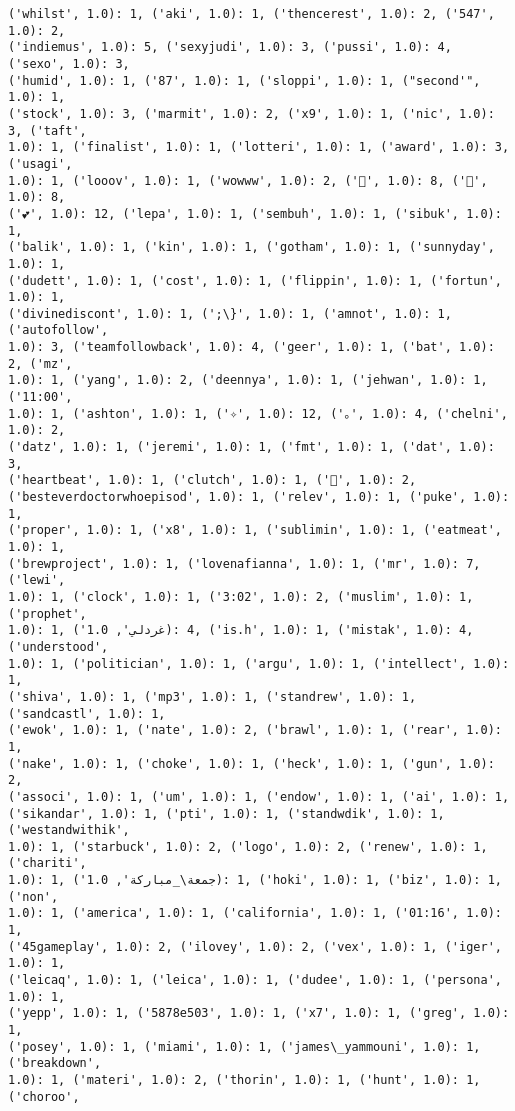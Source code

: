 \documentclass[11pt]{article}
\begin{document}
\begin{Verbatim}[commandchars=\\\{\}]
('whilst', 1.0): 1, ('aki', 1.0): 1, ('thencerest', 1.0): 2, ('547', 1.0): 2,
('indiemus', 1.0): 5, ('sexyjudi', 1.0): 3, ('pussi', 1.0): 4, ('sexo', 1.0): 3,
('humid', 1.0): 1, ('87', 1.0): 1, ('sloppi', 1.0): 1, ("second'", 1.0): 1,
('stock', 1.0): 3, ('marmit', 1.0): 2, ('x9', 1.0): 1, ('nic', 1.0): 3, ('taft',
1.0): 1, ('finalist', 1.0): 1, ('lotteri', 1.0): 1, ('award', 1.0): 3, ('usagi',
1.0): 1, ('looov', 1.0): 1, ('wowww', 1.0): 2, ('💙', 1.0): 8, ('💚', 1.0): 8,
('💕', 1.0): 12, ('lepa', 1.0): 1, ('sembuh', 1.0): 1, ('sibuk', 1.0): 1,
('balik', 1.0): 1, ('kin', 1.0): 1, ('gotham', 1.0): 1, ('sunnyday', 1.0): 1,
('dudett', 1.0): 1, ('cost', 1.0): 1, ('flippin', 1.0): 1, ('fortun', 1.0): 1,
('divinediscont', 1.0): 1, (';\}', 1.0): 1, ('amnot', 1.0): 1, ('autofollow',
1.0): 3, ('teamfollowback', 1.0): 4, ('geer', 1.0): 1, ('bat', 1.0): 2, ('mz',
1.0): 1, ('yang', 1.0): 2, ('deennya', 1.0): 1, ('jehwan', 1.0): 1, ('11:00',
1.0): 1, ('ashton', 1.0): 1, ('✧', 1.0): 12, ('｡', 1.0): 4, ('chelni', 1.0): 2,
('datz', 1.0): 1, ('jeremi', 1.0): 1, ('fmt', 1.0): 1, ('dat', 1.0): 3,
('heartbeat', 1.0): 1, ('clutch', 1.0): 1, ('🐢', 1.0): 2,
('besteverdoctorwhoepisod', 1.0): 1, ('relev', 1.0): 1, ('puke', 1.0): 1,
('proper', 1.0): 1, ('x8', 1.0): 1, ('sublimin', 1.0): 1, ('eatmeat', 1.0): 1,
('brewproject', 1.0): 1, ('lovenafianna', 1.0): 1, ('mr', 1.0): 7, ('lewi',
1.0): 1, ('clock', 1.0): 1, ('3:02', 1.0): 2, ('muslim', 1.0): 1, ('prophet',
1.0): 1, ('غردلي', 1.0): 4, ('is.h', 1.0): 1, ('mistak', 1.0): 4, ('understood',
1.0): 1, ('politician', 1.0): 1, ('argu', 1.0): 1, ('intellect', 1.0): 1,
('shiva', 1.0): 1, ('mp3', 1.0): 1, ('standrew', 1.0): 1, ('sandcastl', 1.0): 1,
('ewok', 1.0): 1, ('nate', 1.0): 2, ('brawl', 1.0): 1, ('rear', 1.0): 1,
('nake', 1.0): 1, ('choke', 1.0): 1, ('heck', 1.0): 1, ('gun', 1.0): 2,
('associ', 1.0): 1, ('um', 1.0): 1, ('endow', 1.0): 1, ('ai', 1.0): 1,
('sikandar', 1.0): 1, ('pti', 1.0): 1, ('standwdik', 1.0): 1, ('westandwithik',
1.0): 1, ('starbuck', 1.0): 2, ('logo', 1.0): 2, ('renew', 1.0): 1, ('chariti',
1.0): 1, ('جمعة\_مباركة', 1.0): 1, ('hoki', 1.0): 1, ('biz', 1.0): 1, ('non',
1.0): 1, ('america', 1.0): 1, ('california', 1.0): 1, ('01:16', 1.0): 1,
('45gameplay', 1.0): 2, ('ilovey', 1.0): 2, ('vex', 1.0): 1, ('iger', 1.0): 1,
('leicaq', 1.0): 1, ('leica', 1.0): 1, ('dudee', 1.0): 1, ('persona', 1.0): 1,
('yepp', 1.0): 1, ('5878e503', 1.0): 1, ('x7', 1.0): 1, ('greg', 1.0): 1,
('posey', 1.0): 1, ('miami', 1.0): 1, ('james\_yammouni', 1.0): 1, ('breakdown',
1.0): 1, ('materi', 1.0): 2, ('thorin', 1.0): 1, ('hunt', 1.0): 1, ('choroo',

\end{Verbatim}
\end{document}
